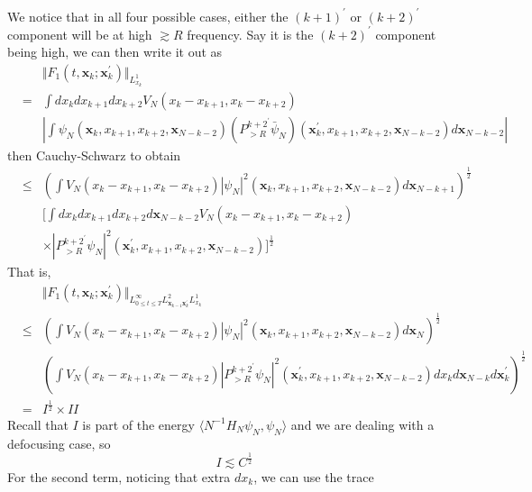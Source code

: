 \documentclass[12pt,letterpaper,leqno]{amsart}
\theoremstyle{plain}
\numberwithin{equation}{section}
\numberwithin{theorem}{section}
\numberwithin{proposition}{section}
\numberwithin{lemma}{section}
\numberwithin{corollary}{section}
\begin{document}
We notice that in all four possible cases, either the $(k+1)^{\prime }$ or $%
(k+2)^{\prime }$ component will be at high $\gtrsim R$ frequency. Say it is
the $(k+2)^{\prime }$ component being high, we can then write it out as%
\begin{eqnarray*}
&&\Vert F_{1}(t,\mathbf{x}_{k};\mathbf{x}_{k}^{\prime })\Vert
_{L_{x_{k}}^{1}} \\
&=&\int dx_{k}dx_{k+1}dx_{k+2}V_{N}(x_{k}-x_{k+1},x_{k}-x_{k+2}) \\
&&\left\vert \int \psi _{N}(\mathbf{x}_{k},x_{k+1},x_{k+2},\mathbf{x}%
_{N-k-2})\left( P_{>R}^{k+2^{\prime }}\bar{\psi}_{N}\right) (\mathbf{x}%
_{k}^{\prime },x_{k+1},x_{k+2},\mathbf{x}_{N-k-2})d\mathbf{x}%
_{N-k-2}\right\vert
\end{eqnarray*}%
then Cauchy-Schwarz to obtain%
\begin{eqnarray*}
&\leqslant &\left( \int V_{N}(x_{k}-x_{k+1},x_{k}-x_{k+2})\left\vert \psi
_{N}\right\vert ^{2}(\mathbf{x}_{k},x_{k+1},x_{k+2},\mathbf{x}_{N-k-2})d%
\mathbf{x}_{N-k+1}\right) ^{\frac{1}{2}} \\
&&[\int dx_{k}dx_{k+1}dx_{k+2}d\mathbf{x}%
_{N-k-2}V_{N}(x_{k}-x_{k+1},x_{k}-x_{k+2}) \\
&&\times \left\vert P_{>R}^{k+2^{\prime }}\psi _{N}\right\vert ^{2}(\mathbf{x%
}_{k}^{\prime },x_{k+1},x_{k+2},\mathbf{x}_{N-k-2})]^{\frac{1}{2}}
\end{eqnarray*}%
That is,%
\begin{eqnarray*}
&&\Vert F_{1}(t,\mathbf{x}_{k};\mathbf{x}_{k}^{\prime })\Vert _{L_{0\leq
t\leq T}^{\infty }L_{\mathbf{x}_{k-1}\mathbf{x}_{k}^{\prime
}}^{2}L_{x_{k}}^{1}} \\
&\leqslant &\left( \int V_{N}(x_{k}-x_{k+1},x_{k}-x_{k+2})\left\vert \psi
_{N}\right\vert ^{2}(\mathbf{x}_{k},x_{k+1},x_{k+2},\mathbf{x}_{N-k-2})d%
\mathbf{x}_{N}\right) ^{\frac{1}{2}} \\
&&\left( \int V_{N}(x_{k}-x_{k+1},x_{k}-x_{k+2})\left\vert
P_{>R}^{k+2^{\prime }}\psi _{N}\right\vert ^{2}(\mathbf{x}_{k}^{\prime
},x_{k+1},x_{k+2},\mathbf{x}_{N-k-2})dx_{k}d\mathbf{x}_{N-k}d\mathbf{x}%
_{k}^{\prime }\right) ^{\frac{1}{2}} \\
&=&I^{\frac{1}{2}}\times II
\end{eqnarray*}%
Recall that $I$ is part of the energy $\langle N^{-1}H_{N}\psi _{N},\psi
_{N}\rangle $ and we are dealing with a defocusing case, so 
\begin{equation*}
I\lesssim C^{\frac{1}{2}}
\end{equation*}%
For the second term, noticing that extra $dx_{k}$, we can use the trace
\end{document}
